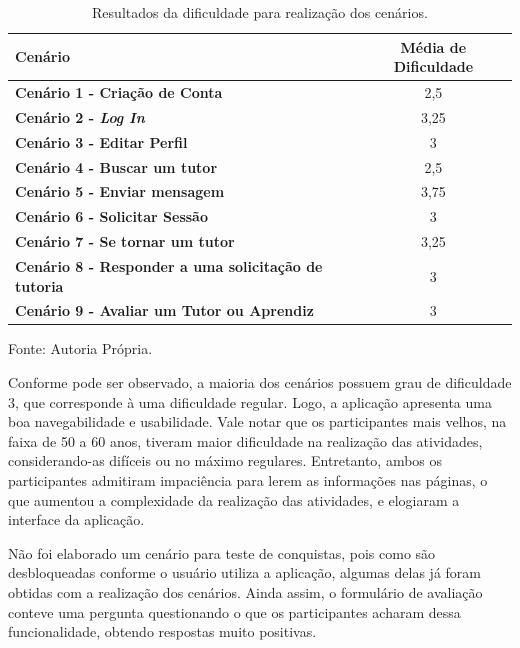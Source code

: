 \begin{table}[H]
    \centering
    \caption{Resultados da dificuldade para realização dos cenários.}
    \label{tab:resultados-usabilidade}
    \begin{tabular}{|l|c|}
        \hline
        \textbf{Cenário} & \textbf{Média de Dificuldade}\\
        \hline
        \textbf{Cenário 1 - Criação de Conta} & 2,5
        \\
        \hline
        \textbf{Cenário 2 - \textit{Log In}} & 3,25
        \\
        \hline
        \textbf{Cenário 3 - Editar Perfil} & 3
        \\
        \hline
        \textbf{Cenário 4 - Buscar um tutor} & 2,5
        \\
        \hline
        \textbf{Cenário 5 - Enviar mensagem} & 3,75
        \\
        \hline
        \textbf{Cenário 6 - Solicitar Sessão} & 3
        \\
        \hline
        \textbf{Cenário 7 - Se tornar um tutor} & 3,25
        \\
        \hline
        \textbf{Cenário 8 - Responder a uma solicitação de tutoria} & 3 
        \\
        \hline
        \textbf{Cenário 9 - Avaliar um Tutor ou Aprendiz} & 3
        \\
        \hline
    \end{tabular}
    \vspace{0.2cm} %
    
    Fonte: Autoria Própria.
\end{table}

Conforme pode ser observado, a maioria dos cenários possuem grau de dificuldade 3, que corresponde à uma dificuldade regular. Logo, a aplicação apresenta uma boa navegabilidade e usabilidade. Vale notar que os participantes mais velhos, na faixa de 50 a 60 anos, tiveram maior dificuldade na realização das atividades, considerando-as difíceis ou no máximo regulares. Entretanto, ambos os participantes admitiram impaciência para lerem as informações nas páginas, o que aumentou a complexidade da realização das atividades, e elogiaram a interface da aplicação.

Não foi elaborado um cenário para teste de conquistas, pois como são desbloqueadas conforme o usuário utiliza a aplicação, algumas delas já foram obtidas com a realização dos cenários. Ainda assim, o formulário de avaliação conteve uma pergunta questionando o que os participantes acharam dessa funcionalidade, obtendo respostas muito positivas.

